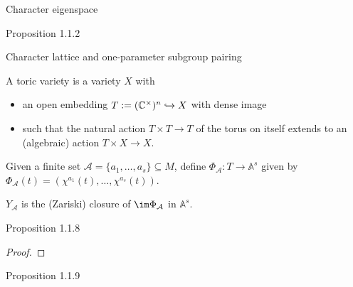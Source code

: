 \begin{definition}
  \label{char_eigenspace}
  Character eigenspace
\end{definition}

\begin{proposition}
  \label{prop:1.1.2}
  Proposition 1.1.2
\end{proposition}

\begin{definition}
  \label{char_ops_pairing}
  Character lattice and one-parameter subgroup pairing
\end{definition}

\begin{definition}
  \label{ToricVariety}
  \leanok
  A toric variety is a variety \(X\) with
  \begin{itemize}
    \item an open embedding \(T := ({\mathbb C}^\times)^n \hookrightarrow X\) with dense image
    \item such that the natural action \(T \times T \to T\) of the torus on itself extends to an (algebraic) action \(T \times X \to X\).
  \end{itemize}
\end{definition}

\begin{definition}
  \label{phiA}
  Given a finite set \(\mathcal A = \{a_1, \dotsc, a_s\} \subseteq M\), define \(\Phi_{\mathcal{A}} : T \to \mathbb A^s\) given by \(\Phi_{\mathcal A} (t) = (\chi^{a_1} (t), \dotsc, \chi^{a_s} (t))\).
\end{definition}

\begin{definition}
  \label{YA}
  \(Y_{\mathcal{A}}\) is the (Zariski) closure of \(\im \Phi_{\mathcal A}\) in \(\mathbb A^s\).
\end{definition}

\begin{proposition}
  \label{prop:1.1.8}
  Proposition 1.1.8
\end{proposition}
\begin{proof}
\end{proof}

\begin{proposition}
  \label{prop:1.1.9}
  Proposition 1.1.9
\end{proposition}

